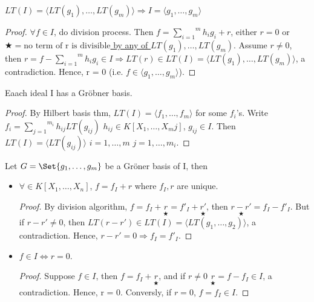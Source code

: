 \begin{prop}
  $LT(I) = \langle LT(g_1),\dots,LT(g_m) \rangle \Rightarrow I = \langle g_1,\dots,g_m \rangle$
  \begin{proof}
    $\forall f \in I$, do division process. Then $f = \overset{m}{\underset{i = 1}{\sum}} h_ig_i+r$, either $r=0$ or \uline{$\bigstar = \text{no term of r is divisible}$ by any of $LT(g_1),\dots,LT(g_m)$}. Assume $r \neq 0$, then $r = f - \overset{m}{\underset{i = 1}{\sum}} h_i g_i \in I \Rightarrow LT(r) \in LT(I) = \langle LT(g_1),\dots, LT(g_m) \rangle$, a contradiction. Hence, r = 0 (i.e. $f\in \langle g_1,\dots,g_m \rangle$).
  \end{proof}
\end{prop}

\begin{theorem} \label{thm:Grobner_existense}
  Eaach ideal I has a Gr\"{o}bner basis.
  \begin{proof}
    By Hilbert basis thm, $LT(I) = \langle f_1,\dots,f_m \rangle$ for some $f_i$'s. Write $f_i = \overset{m_i}{\underset{j = 1}{\sum}}h_{ij}LT(g_{ij})$ $h_{ij} \in K[X_1,\dots,X_mj]$, $g_{ij} \in I$. Then $LT(I) = \langle LT(g_{ij}) \rangle$ $i=1,\dots,m$ $j=1,\dots,m_i$.
  \end{proof}
\end{theorem}

\begin{theorem} \label{thm:Grobner_property}
  Let $G = \Set{g_1,\dots,g_m}$ be a Gr\"{o}ner basis of I, then
  \begin{itemize}
    \item $\forall \in K[X_1,\dots,X_n]$, $f = f_I + r$ where $f_I,r$ are unique.
      \begin{proof}
        By division algorithm, $f = f_I +\underset{\bigstar}{r} = f'_I+\underset{\bigstar}{r'}$, then $\underset{\bigstar}{r-r'} = f_I-f'_I$. But if $r-r' \neq 0$, then $LT(r-r') \in LT(I) = \langle LT(g_1,\dots,g_2) \rangle$, a contradiction. Hence, $r-r' = 0\Rightarrow f_I = f'_I$.
      \end{proof}
    \item $f \in I \iff r=0$.
      \begin{proof}
        Suppose $f \in I$, then $f = f_I + \underset{\bigstar}{r}$, and if $r\neq 0$ $\underset{\bigstar}{r} = f - f_I\in I$, a contradiction. Hence, r = 0. Conversly, if $r = 0$, $f = f_I \in I$. 
      \end{proof}
  \end{itemize}
\end{theorem}



